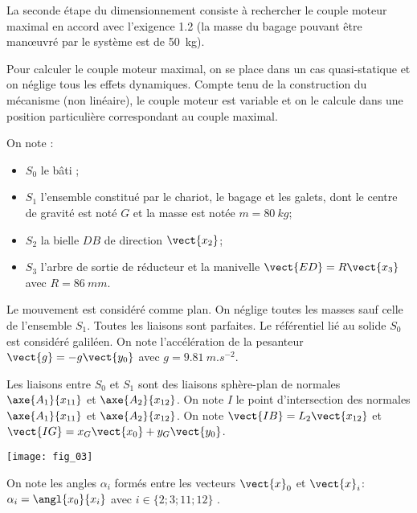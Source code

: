 \begin{obj}
La seconde étape du dimensionnement consiste à rechercher le couple moteur maximal en accord avec
l’exigence 1.2 (la masse du bagage pouvant être manœuvré par le système est de \SI{50}{kg}).
\end{obj}


\ifprof
\else


Pour calculer le couple moteur maximal, on se place dans un cas quasi-statique et on néglige tous les effets
dynamiques. Compte tenu de la construction du mécanisme (non linéaire), le couple moteur est variable et on
le calcule dans une position particulière correspondant au couple maximal.

On note :
\begin{itemize}
\item $S_0$ le bâti ;
\item $S_1$ l’ensemble constitué par le chariot, le bagage et les galets, dont le centre de gravité est noté $G$ et la masse est notée $m=\SI{80}{kg}$;
\item $S_2$ la bielle $DB$ de direction $\vect{x_2}$;
\item $S_3$ l’arbre de sortie de réducteur et la manivelle $\vect{ED}=R\vect{x_3}$ avec $R=\SI{86}{mm}$.
\end{itemize}
Le mouvement est considéré comme plan. On néglige toutes les masses sauf celle de l’ensemble $S_1$. Toutes les liaisons sont parfaites. Le référentiel lié au solide $S_0$ est considéré galiléen. On note l’accélération de la pesanteur $\vect{g}=-g\vect{y_0}$ avec $g=\SI{9,81}{m.s^{-2}}$.

Les liaisons entre $S_0$ et $S_1$ sont des liaisons sphère-plan de normales $\axe{A_1}{{x}_{11}}$ et $\axe{A_2}{{x}_{12}}$.
On note $I$ le point d’intersection des normales $\axe{A_1}{{x}_{11}}$ et $\axe{A_2}{{x}_{12}}$. On note $\vect{IB}=L_2\vect{x_{12}}$ et $\vect{IG}=x_G\vect{x_{0}}+y_G\vect{y_{0}}$.

\begin{marginfigure}
\centering
\texttt{[image: fig\_03]}
\end{marginfigure}

On note les angles $\alpha_i$ formés entre les vecteurs $\vect{x}_0$ et $\vect{x}_i$: $\alpha_i=\angl{{x}_0}{{x}_i}$ avec $i\in \{2;3;11;12\}$ .



